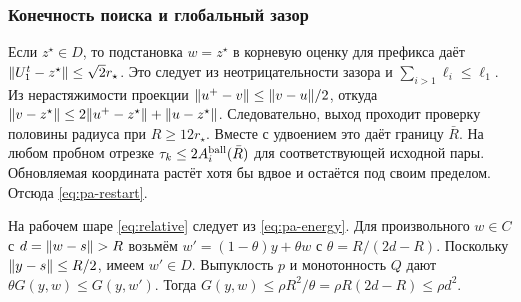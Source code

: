 \subsubsection{Конечность поиска и глобальный зазор}

Если $z^\star\in D$, то подстановка $w=z^\star$ в корневую оценку
для префикса даёт $\lVert U_1^t-z^\star\rVert\le\sqrt2 r_\star$.
Это следует из неотрицательности зазора и
$\sum_{i>1}\ell_i\le\ell_1$. Из нерастяжимости проекции
$\lVert u^+-v\rVert\le\lVert v-u\rVert/2$, откуда
$\lVert v-z^\star\rVert\le2\lVert u^+-z^\star\rVert+\lVert u-z^\star\rVert$.
Следовательно, выход проходит проверку половины радиуса при
$R\ge12r_\star$. Вместе с удвоением это даёт границу $\bar R$.
На любом пробном отрезке $\tau_k\le 2A_i^{\rm ball}(\bar R)$
для соответствующей исходной пары. Обновляемая координата растёт
хотя бы вдвое и остаётся под своим пределом. Отсюда
\eqref{eq:pa-restart}.

На рабочем шаре \eqref{eq:relative} следует из \eqref{eq:pa-energy}.
Для произвольного $w\in C$ с $d=\lVert w-s\rVert>R$ возьмём
$w'=(1-\theta)y+\theta w$ с $\theta=R/(2d-R)$.
Поскольку $\lVert y-s\rVert\le R/2$, имеем $w'\in D$.
Выпуклость $p$ и монотонность $Q$ дают
$\theta G(y,w)\le G(y,w')$. Тогда
$G(y,w)\le\rho R^2/\theta=\rho R(2d-R)\le\rho d^2$.
